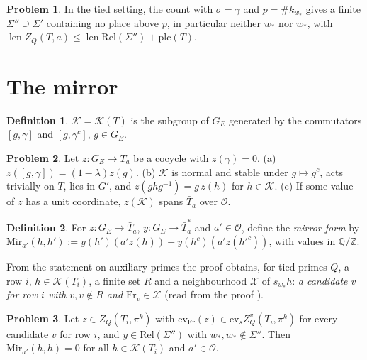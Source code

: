 \documentclass[reqno]{amsart}
\theoremstyle{definition}
\newtheorem{problem}{Problem}[section]
\newtheorem{definition}{Definition}[section]
\theoremstyle{plain}
\newcommand{\Z}{\mathbb{Z}}
\newcommand{\Q}{\mathbb{Q}}
\newcommand{\Oc}{\mathcal{O}}
\newcommand{\len}{\operatorname{len}}
\newcommand{\Fr}{\mathrm{Fr}}
\newcommand{\ev}{\mathrm{ev}}
\newcommand{\Rel}{\mathrm{Rel}}
\newcommand{\Mir}{\mathrm{Mir}}
\newcommand{\Kc}{\mathcal{K}}
\newcommand{\Xc}{\mathcal{X}}
\begin{document}
\begin{problem}\label{pr:cancel}
In the tied setting, the count with \(\sigma = \gamma\) and \(p = \#k_{w_*}\) gives a finite \(\Sigma'' \supseteq \Sigma'\) containing no place above \(p\), in particular neither \(w_*\) nor \(\bar w_*\), with \(\len Z_Q(T, a) \le \len \Rel(\Sigma'') + \mathrm{plc}(T)\).
\end{problem}

\section{The mirror}\label{sec:mirror}

\begin{definition}\label{def:commutators}
\(\Kc = \Kc(T)\) is the subgroup of \(G_E\) generated by the commutators \([g, \gamma]\) and \([g, \gamma^c]\), \(g \in G_E\).
\end{definition}

\begin{problem}\label{pr:commutator}
Let \(z \colon G_E \to \bar T_a\) be a cocycle with \(z(\gamma) = 0\).  \textup{(a)} \(z([g, \gamma]) = (1 - \lambda)z(g)\).  \textup{(b)} \(\Kc\) is normal and stable under \(g \mapsto g^c\), acts trivially on \(T\), lies in \(G'\), and \(z(ghg^{-1}) = g\,z(h)\) for \(h \in \Kc\).  \textup{(c)} If some value of \(z\) has a unit coordinate, \(z(\Kc)\) spans \(\bar T_a\) over \(\Oc\).
\end{problem}

\begin{definition}\label{def:mirror}
For \(z \colon G_E \to \bar T_a\), \(y \colon G_E \to \bar T_a^{*}\) and \(a' \in \Oc\), define the \emph{mirror form} by \(\Mir_{a'}(h, h') := y(h')(a'z(h)) - y(h^c)(a'z(h'^c))\), with values in \(\Q/\Z\).
\end{definition}

From the statement on auxiliary primes the proof obtains, for tied primes \(Q\), a row \(i\), \(h \in \Kc(T_i)\), a finite set \(R\) and a neighbourhood \(\Xc\) of \(s_{w_*}h\): \emph{a candidate \(v\) for row \(i\) with \(v, \bar v \notin R\) and \(\Fr_v \in \Xc\)} (read from the proof \cite{GL}).

\begin{problem}\label{pr:diagonal}
Let \(z \in Z_Q(T_i, \pi^k)\) with \(\ev_{\Fr}(z) \in \ev_s Z^v_Q(T_i, \pi^k)\) for every candidate \(v\) for row \(i\), and \(y \in \Rel(\Sigma'')\) with \(w_*, \bar w_* \notin \Sigma''\).  Then \(\Mir_{a'}(h, h) = 0\) for all \(h \in \Kc(T_i)\) and \(a' \in \Oc\).
\end{problem}
\end{document}
